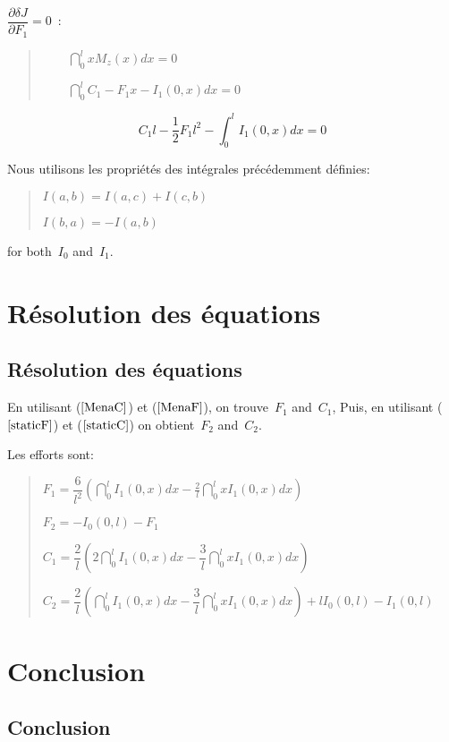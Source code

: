 $\dfrac{\partial \delta J}{\partial F_1}=0$~:

\begin{quotation}
$\qquad \dint_0^lxM_z(x)dx=0$

$\qquad \dint_0^lC_1-F_1x-I_1(0,x)dx=0$
\end{quotation}

\begin{equation}
  \label{MenaF}
  C_1l-\frac 12F_1l^2-\int_0^lI_1(0,x)dx=0
\end{equation}

Nous utilisons les propriétés des intégrales précédemment définies:

\begin{quotation}
$I(a,b)=I(a,c)+I(c,b)$

$I(b,a)=-I(a,b)$
\end{quotation}

for both~$I_0$ and~$I_1$.


\medskip
\ifVersionAvecExemplesSepares
  \section{Résolution des équations}
\else
  \subsection{Résolution des équations}
\fi

En utilisant ($\ref{MenaC}$) et ($\ref{MenaF}$), on trouve~$F_1$ and~$C_1$,
Puis, en utilisant ($\ref{staticF}$) et ($\ref{staticC}$) on obtient~$F_2$ and~$C_2$.

Les efforts sont:

\begin{quotation}
$F_1=\dfrac 6{l^2}\left( \dint_0^lI_1(0,x)dx-\frac
2l\dint_0^lxI_1(0,x)dx\right)~$

$F_2=-I_0(0,l)-F_1$

$C_1=\dfrac 2l\left( 2\dint_0^lI_1(0,x)dx-\dfrac
3l\dint_0^lxI_1(0,x)dx\right)~$

$C_2=\dfrac 2l\left( \dint_0^lI_1(0,x)dx-\dfrac
3l\dint_0^lxI_1(0,x)dx\right) +lI_0(0,l)-I_1(0,l)$
\end{quotation}

\medskip
\ifVersionAvecExemplesSepares
  \section{Conclusion}
\else
  \subsection{Conclusion}
\fi

